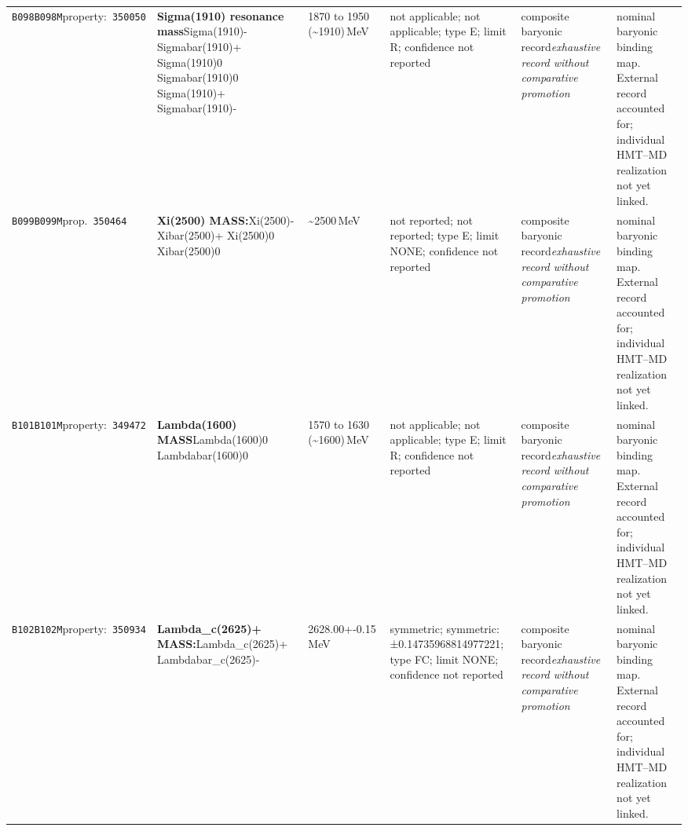 \begin{landscape}
\begin{longtable}{L{1.85cm}L{4.45cm}L{2.35cm}L{4.05cm}L{3.35cm}L{7.15cm}}
\texttt{B098}\newline \texttt{B098M}\newline property:\ \texttt{350050} & \textbf{Sigma(1910) resonance mass}\newline Sigma(1910)- \textbar{}\allowbreak{} Sigmabar(1910)+ \textbar{}\allowbreak{} Sigma(1910)0 \textbar{}\allowbreak{} Sigmabar(1910)0 \textbar{}\allowbreak{} Sigma(1910)+ \textbar{}\allowbreak{} Sigmabar(1910)- & 1870 to 1950 (\textasciitilde{}1910)\,MeV & not applicable; not applicable; type E; limit R; confidence not reported & composite baryonic record\newline \emph{exhaustive record without comparative promotion} & nominal baryonic binding map. External record accounted for; individual HMT--MD realization not yet linked. \\
\texttt{B099}\newline \texttt{B099M}\newline prop.\ \texttt{350464} & \textbf{Xi(2500) MASS:}\newline Xi(2500)- \textbar{}\allowbreak{} Xibar(2500)+ \textbar{}\allowbreak{} Xi(2500)0 \textbar{}\allowbreak{} Xibar(2500)0 & \textasciitilde{}2500\,MeV & not reported; not reported; type E; limit NONE; confidence not reported & composite baryonic record\newline \emph{exhaustive record without comparative promotion} & nominal baryonic binding map. External record accounted for; individual HMT--MD realization not yet linked. \\
\texttt{B101}\newline \texttt{B101M}\newline property:\ \texttt{349472} & \textbf{Lambda(1600) MASS}\newline Lambda(1600)0 \textbar{}\allowbreak{} Lambdabar(1600)0 & 1570 to 1630 (\textasciitilde{}1600)\,MeV & not applicable; not applicable; type E; limit R; confidence not reported & composite baryonic record\newline \emph{exhaustive record without comparative promotion} & nominal baryonic binding map. External record accounted for; individual HMT--MD realization not yet linked. \\
\texttt{B102}\newline \texttt{B102M}\newline property:\ \texttt{350934} & \textbf{Lambda\_\allowbreak{}c(2625)+ MASS:}\newline Lambda\_\allowbreak{}c(2625)+ \textbar{}\allowbreak{} Lambdabar\_\allowbreak{}c(2625)- & 2628.00+-0.15\,MeV & symmetric; symmetric: ±0.14735968814977221; type FC; limit NONE; confidence not reported & composite baryonic record\newline \emph{exhaustive record without comparative promotion} & nominal baryonic binding map. External record accounted for; individual HMT--MD realization not yet linked. \\

\end{longtable}
\end{landscape}
